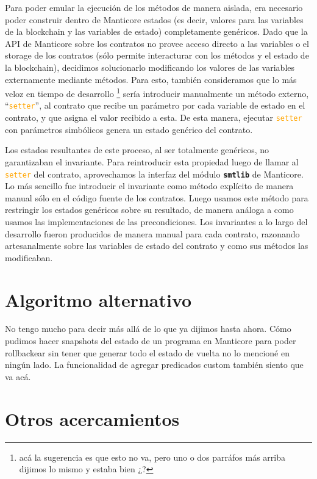 Para poder emular la ejecución de los métodos de manera aislada, era necesario poder construir dentro de Manticore estados (es decir, valores para las variables de la blockchain y las variables de estado) completamente genéricos.
Dado que la API de Manticore sobre los contratos no provee acceso directo a las variables o el storage de los contratos (sólo permite interacturar con los métodos y el estado de la blockchain), decidimos solucionarlo modificando los valores de las variables externamente mediante métodos.
Para esto, también consideramos que lo más veloz en tiempo de desarrollo \footnote{acá la sugerencia es que esto no va, pero uno o dos parráfos más arriba dijimos lo mismo y estaba bien ¿?} sería introducir manualmente un método externo, ``\textcolor{orange}{\texttt{setter}}'', al contrato que recibe un parámetro por cada variable de estado en el contrato, y que asigna el valor recibido a esta.
De esta manera, ejecutar \textcolor{orange}{\texttt{setter}} con parámetros simbólicos genera un estado genérico del contrato.

Los estados resultantes de este proceso, al ser totalmente genéricos, no garantizaban el invariante.
Para reintroducir esta propiedad luego de llamar al \textcolor{orange}{\texttt{setter}} del contrato, aprovechamos la interfaz del módulo \texttt{\textbf{smtlib}} de Manticore.
Lo más sencillo fue introducir el invariante como método explícito de manera manual sólo en el código fuente de los contratos.
Luego usamos este método para restringir los estados genéricos sobre su resultado, de manera análoga a como usamos las implementaciones de las precondiciones.
Los invariantes a lo largo del desarrollo fueron producidos de manera manual para cada contrato, razonando artesanalmente sobre las variables de estado del contrato y como sus métodos las modificaban.

\section{Algoritmo alternativo}
No tengo mucho para decir más allá de lo que ya dijimos hasta ahora.
Cómo pudimos hacer snapshots del estado de un programa en Manticore para poder rollbackear sin tener que generar todo el estado de vuelta no lo mencioné en ningún lado.
La funcionalidad de agregar predicados custom también siento que va acá.

\section{Otros acercamientos}
